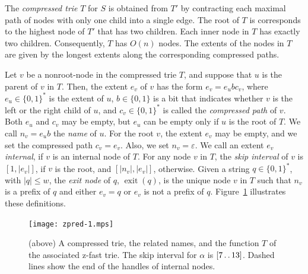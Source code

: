\documentclass[a4paper,11pt]{article}
\newcommand{\eps}{\varepsilon}
\newcommand{\?}{\mskip1.5mu}
\def\..{\,\mathpunct{\ldotp\ldotp}} %
\DeclareMathOperator{\exit}{exit}
\begin{document}
The \emph{compressed trie} $T$ for $S$ is obtained
from $T'$ by contracting each maximal path of nodes
with only one child into a single edge. 
The root of $T$ is corresponds to the highest node of $T'$ that has 
two children.  Each inner node in $T$ has exactly two children. 
Consequently, $T$ has $O(n)$ nodes. 
The extents of the nodes in $T$ are given by the longest 
extents along the corresponding compressed paths.

Let $v$ be a nonroot-node in the compressed trie $T$,
and suppose that $u$ is the parent of $v$ in $T$. Then, 
the extent $e_v$ of $v$ has the form $e_v = e_ubc_v$, 
where $e_u \in \{0, 1\}^*$ is the extent of $u$, $b \in \{0,1\}$ is 
a bit that indicates whether $v$ is the left or the right child
of $u$, and $c_v \in \{0, 1\}^*$ is called the \emph{compressed
path} of $v$. Both $e_u$ and $c_v$ may be empty, but $e_u$
can be empty only if $u$ is the root of $T$. 
We call $n_v = e_ub$ the \emph{name} of $u$.
For the root $v$, the extent $e_v$ may be empty, and we set
the compressed path $c_v = e_v$. Also, we set $n_v = \eps$.
We call an extent $e_v$ \emph{internal}, if $v$ is an internal
node of $T$.
For any node $v$ in $T$, the \emph{skip interval} of $v$ is 
$[1, |e_v|]$, if $v$ is the root, and $[|n_v|, |e_v|]$, otherwise.
Given a string $q \in \{0, 1\}^*$, with $|q| \leq w$, the 
\emph{exit node} of $q$, $\exit(q)$, is the unique node
$v$ in $T$ such that $n_v$ is a prefix of $q$ and either
$e_v = q$ or $e_v$ is not a prefix of $q$.
Figure~\ref{fig:ztrie} illustrates these definitions.

\begin{figure}[t]
\centering
\texttt{[image: zpred-1.mps]}\qquad{}
\caption{(above) A compressed trie, the 
related names, and the function $T$ of the associated 
z-fast trie. The skip interval for $\alpha$ is $[7\..13]$. 
Dashed lines show the end of the handles of internal nodes.}
\label{fig:ztrie}
\end{figure}
\end{document}
